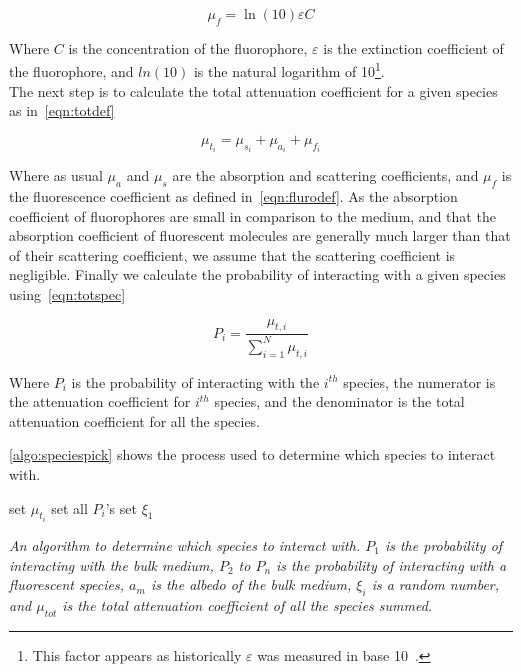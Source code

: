 \begin{equation}
\mu_f=\ln\left(10\right)\varepsilon C
\label{eqn:flurodef}
\end{equation}

Where $C$ is the concentration of the fluorophore, $\varepsilon$ is the extinction coefficient of the fluorophore, and $ln(10)$ is the natural logarithm of 10\footnote{This factor appears as historically $\varepsilon$ was measured in base 10~\cite{jacques2013optical}.}.\\

The next step is to calculate the total attenuation coefficient for a given species as in~\cref{eqn:totdef}

\begin{equation}
\mu_{t_i}=\mu_{s_i}+\mu_{a_i}+\mu_{f_i}
\label{eqn:totdef}
\end{equation}

Where as usual $\mu_a$ and $\mu_s$ are the absorption and scattering coefficients, and $\mu_f$ is the fluorescence coefficient as defined in~\cref{eqn:flurodef}.
As the absorption coefficient of fluorophores are small in comparison to the medium, and that the absorption coefficient of fluorescent molecules are generally much larger than that of their scattering coefficient, we assume that the scattering coefficient is negligible.
Finally we calculate the probability of interacting with a given species using~\cref{eqn:totspec}

\begin{equation}
P_i=\frac{\mu_{t,i}}{\sum\limits_{i=1}^{N} \mu_{t,i}}
\label{eqn:totspec}
\end{equation}

Where $P_i$ is the probability of interacting with the $i^{th}$ species, the numerator is the attenuation coefficient for $i^{th}$ species, and the denominator is the total attenuation coefficient for all the species.

\cref{algo:speciespick} shows the process used to determine which species to interact with.

\begin{center}
\begin{algorithm}[H]
\SetAlgoLined
  set $\mu_{t_{i}}$\;
  set all $P_i$'s\;
  set $\xi_1$\;
\
\caption{\textit{An algorithm to determine which species to interact with. $P_1$ is the probability of interacting with the bulk medium, $P_2$ to $P_n$ is the probability of interacting with a fluorescent species, $a_m$ is the albedo of the bulk medium, $\xi_i$ is a random number, and $\mu_{tot}$ is the total attenuation coefficient of all the species summed.}}
\label{algo:speciespick}
\end{algorithm}
\end{center}

